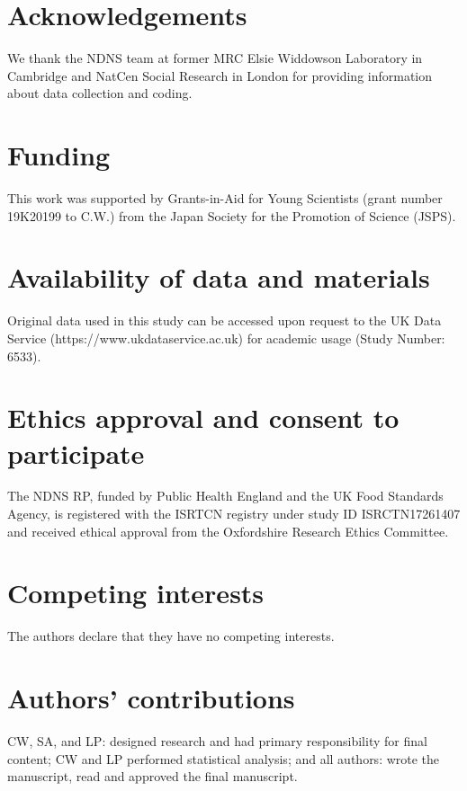 \documentclass{bmcart}
\begin{document}
\begin{backmatter}

\section*{Acknowledgements}%
We thank the NDNS team at former MRC Elsie Widdowson Laboratory in Cambridge and NatCen Social Research in London for providing information about data collection and coding. 

\section*{Funding}%
This work was supported by Grants-in-Aid for Young Scientists (grant number 19K20199 to C.W.) from the Japan Society for the Promotion of Science (JSPS).


\section*{Availability of data and materials}%
Original data used in this study can be accessed upon request to the UK Data Service (https://www.ukdataservice.ac.uk) for academic usage (Study Number: 6533).

\section*{Ethics approval and consent to participate}%
The NDNS RP, funded by Public Health England and the UK Food Standards Agency, is registered with the ISRTCN registry under study ID ISRCTN17261407 and received ethical approval from the Oxfordshire Research Ethics Committee. 

\section*{Competing interests}
The authors declare that they have no competing interests.


\section*{Authors' contributions}
CW, SA, and LP: designed research and had primary responsibility for final content; CW and LP performed statistical analysis; and all authors: wrote the manuscript, read and approved the final manuscript.


\end{backmatter}
\end{document}
